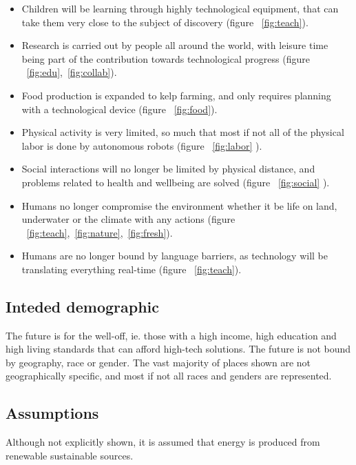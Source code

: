 \begin{itemize}
    \item Children will be learning through highly technological equipment, that can take them very close to the subject of discovery (figure ~\ref{fig:teach}).
    \item Research is carried out by people all around the world, with leisure time being part of the contribution towards technological progress (figure ~\ref{fig:edu},~\ref{fig:collab}).
    \item Food production is expanded to kelp farming, and only requires planning with a technological device (figure ~\ref{fig:food}).
    \item Physical activity is very limited, so much that most if not all of the physical labor is done by autonomous robots (figure ~\ref{fig:labor} ).
    \item Social interactions will no longer be limited by physical distance, and problems related to health and wellbeing are solved (figure ~\ref{fig:social} ).
    \item Humans no longer compromise the environment whether it be life on land, underwater or the climate with any actions (figure ~\ref{fig:teach},~\ref{fig:nature},~\ref{fig:fresh}).
    \item Humans are no longer bound by language barriers, as technology will be translating everything real-time (figure ~\ref{fig:teach}).
\end{itemize}

\subsection{Inteded demographic}
The future is for the well-off, ie. those with a high income, high education and high living standards that can afford high-tech solutions. 
The future is not bound by geography, race or gender. The vast majority of places shown are not geographically specific, and most if not all races and genders are represented.

\subsection{Assumptions}
Although not explicitly shown, it is assumed that energy is produced from renewable sustainable sources. 
